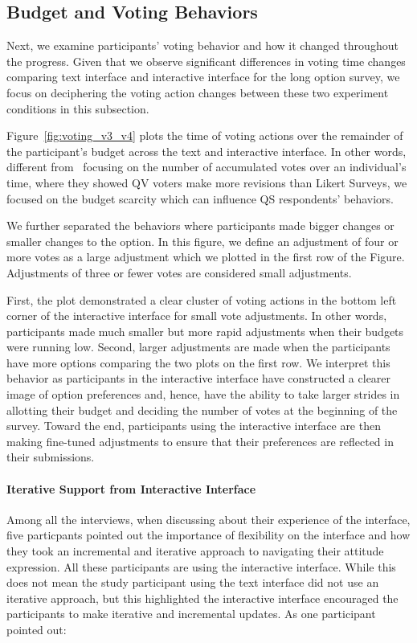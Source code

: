 \subsection{Budget and Voting Behaviors}
Next, we examine participants' voting behavior and how it changed throughout the progress. Given that we observe significant differences in voting time changes comparing text interface and interactive interface for the long option survey, we focus on deciphering the voting action changes between these two experiment conditions in this subsection.

Figure~\ref{fig:voting_v3_v4} plots the time of voting actions over the remainder of the participant's budget across the text and interactive interface. In other words, different from~\textcite{quarfoot2017quadratic} focusing on the number of accumulated votes over an individual's time, where they showed QV voters make more revisions than Likert Surveys, we focused on the budget scarcity which can influence QS respondents' behaviors.

We further separated the behaviors where participants made bigger changes or smaller changes to the option. In this figure, we define an adjustment of four or more votes as a large adjustment which we plotted in the first row of the Figure. Adjustments of three or fewer votes are considered small adjustments.

First, the plot demonstrated a clear cluster of voting actions in the bottom left corner of the interactive interface for small vote adjustments. In other words, participants made much smaller but more rapid adjustments when their budgets were running low. Second, larger adjustments are made when the participants have more options comparing the two plots on the first row. We interpret this behavior as participants in the interactive interface have constructed a clearer image of option preferences and, hence, have the ability to take larger strides in allotting their budget and deciding the number of votes at the beginning of the survey. Toward the end, participants using the interactive interface are then making fine-tuned adjustments to ensure that their preferences are reflected in their submissions.

\paragraph{Iterative Support from Interactive Interface}
Among all the interviews, when discussing about their experience of the interface, five particpants pointed out the importance of flexibility on the interface and how they took an incremental and iterative approach to navigating their attitude expression. All these participants are using the interactive interface. While this does not mean the study participant using the text interface did not use an iterative approach, but this highlighted the interactive interface encouraged the participants to make iterative and incremental updates. As one participant pointed out:

